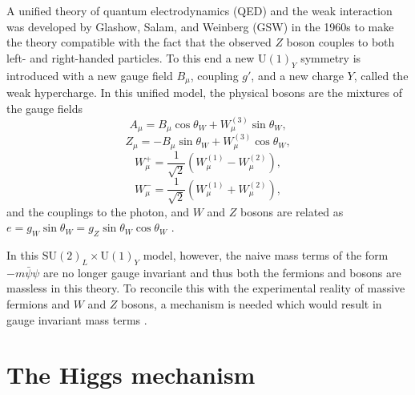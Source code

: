 A unified theory of quantum electrodynamics (QED) and the weak interaction was developed
by Glashow, Salam, and Weinberg (GSW) in the 1960s \cite{Thomson:2013zua} to make the
theory compatible with the fact that the observed $Z$ boson couples to both left- and
right-handed particles. To this end a new $\text{U}(1)_Y$ symmetry is introduced with a new gauge
field $B_\mu$, coupling $g'$, and a new charge $Y$, called the weak hypercharge. In this unified model,
the physical bosons are the mixtures of the gauge fields
\begin{equation}
A_\mu = B_\mu \cos\theta_W + W_\mu^{(3)} \sin{\theta_W},
\end{equation}
\begin{equation}
Z_\mu = - B_\mu \sin{\theta_W} + W_\mu^{(3)} \cos{\theta_W},
\end{equation}
\begin{equation}
W^+_\mu = \frac{1}{\sqrt{2}}\left( W_\mu^{(1)} - W_\mu^{(2)} \right),
\end{equation}
\begin{equation}
W^-_\mu = \frac{1}{\sqrt{2}}\left( W_\mu^{(1)} + W_\mu^{(2)} \right),
\end{equation}
and the couplings to the photon, and $W$ and $Z$ bosons are related as
$e = g_W \sin{\theta_W}  = g_Z \sin{\theta_W} \cos{\theta_W}$ \cite{Thomson:2013zua}.

In this $\text{SU}(2)_L \times \text{U}(1)_Y$ model, however, the naive mass terms of the form $-m\bar\psi\psi$
are no longer gauge invariant and thus both the fermions and bosons are massless in this theory.
To reconcile this with the experimental reality of massive fermions and $W$ and $Z$ bosons, a
mechanism is needed which would result in gauge invariant mass terms \cite{Thomson:2013zua}.

\section{The Higgs mechanism}

